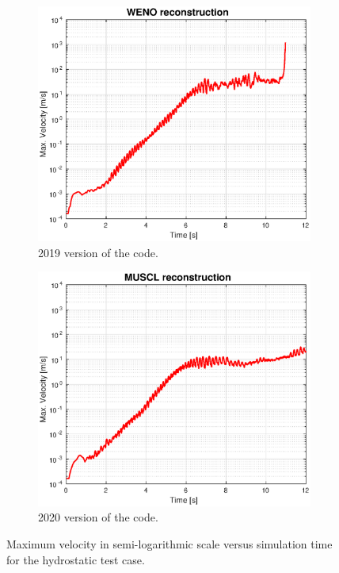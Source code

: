 \documentclass[11pt, a4paper, oneside, openany]{book}
\begin{document}
\begin{figure}[!ht]
	\centering
	\begin{subfigure}{.5\textwidth}
		\includegraphics[width=1\textwidth]{Hydrostatic_WENOTime.eps}
		\caption[Hydrostatic ]{2019 version of the code.}\label{HydrostaticTimeWENO}
	\end{subfigure}%
	\begin{subfigure}{.5\textwidth}
		\includegraphics[width=1\textwidth]{Hydrostatic_MUSCLTime.eps}
		\caption[Poisson Convergence 2020 code]{2020 version of the code.}\label{HydrostaticTimeMUSCL}
	\end{subfigure}
	\caption[Poisson equation convergence study]{Maximum velocity in semi-logarithmic scale versus simulation time for the hydrostatic test case.}\label{HydrostaticTime}
\end{figure}\noindent
\end{document}
